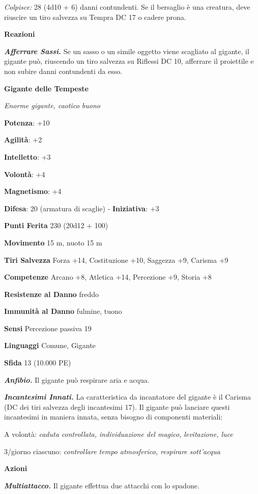 \begin{multicols}{2}
\emph{Colpisce:} 28 (4d10 + 6) danni contundenti. Se il bersaglio è una
creatura, deve riuscire un tiro salvezza su Tempra DC 17 o cadere prona.

\textbf{Reazioni}

\emph{\textbf{Afferrare Sassi.}} Se un sasso o un simile oggetto viene
scagliato al gigante, il gigante può, riuscendo un tiro salvezza su Riflessi DC 10, afferrare il proiettile e non subire danni contundenti
da esso.

\textbf{Gigante delle Tempeste}

\emph{Enorme gigante, caotico buono}

\textbf{Potenza}: +10

\textbf{Agilità}: +2

\textbf{Intelletto}: +3

\textbf{Volontà}: +4

\textbf{Magnetismo}: +4

\textbf{Difesa}: 20 (armatura di scaglie) - \textbf{Iniziativa}: +3

\textbf{Punti Ferita} 230 (20d12 + 100)

\textbf{Movimento} 15 m, nuoto 15 m

\textbf{Tiri Salvezza} Forza +14, Costituzione +10, Saggezza +9, Carisma
+9

\textbf{Competenze} Arcano +8, Atletica +14, Percezione +9, Storia +8

\textbf{Resistenze al Danno} freddo

\textbf{Immunità al Danno} fulmine, tuono

\textbf{Sensi} Percezione passiva 19

\textbf{Linguaggi} Comune, Gigante

\textbf{Sfida} 13 (10.000 PE)\smallskip

\emph{\textbf{Anfibio.}} Il gigante può respirare aria e acqua.

\emph{\textbf{Incantesimi Innati.}} La caratteristica da incantatore del
gigante è il Carisma (DC dei tiri salvezza degli incantesimi 17). Il
gigante può lanciare questi incantesimi in maniera innata, senza bisogno
di componenti materiali:

A volontà: \emph{caduta controllata, individuazione del magico,}
\emph{levitazione, luce}

3/giorno ciascuno: \emph{controllare tempo atmosferico, respirare}
\emph{sott'acqua}

\smallskip\textbf{Azioni}

\emph{\textbf{Multiattacco.}} Il gigante effettua due attacchi con lo
spadone.


\end{multicols}
